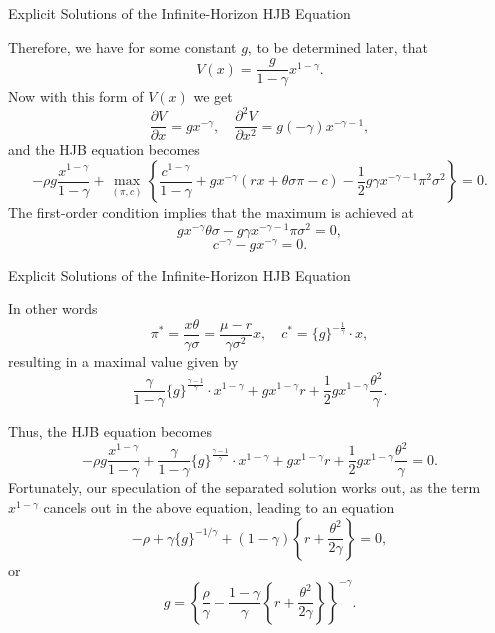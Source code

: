 \documentclass{beamer}
\begin{document}
    \begin{frame}{Explicit Solutions of the Infinite-Horizon HJB Equation}


    {\footnotesize \footnotesize
    Therefore, we have for some constant \( g \), to be determined later, that
    \[
    V(x) = \frac{g}{1 - \gamma}x^{1 - \gamma}. 
    \]
    Now with this form of \( V(x) \) we get
\[
\frac{\partial V}{\partial x} = gx^{-\gamma}, \quad \frac{\partial^2 V}{\partial x^2} = g(-\gamma)x^{-\gamma-1},
\]
 \pause and the HJB equation becomes
\[
-\rho g\frac{x^{1 - \gamma}}{1 - \gamma} + \max_{(\pi,c)} \left\{ \frac{c^{1 - \gamma}}{1 - \gamma} + gx^{-\gamma}(rx + \theta\sigma\pi - c) - \frac{1}{2}g\gamma x^{-\gamma-1}\pi^2\sigma^2 \right\} = 0.
\]
The first-order condition implies that the maximum is achieved at  
\[
gx^{-\gamma} \theta \sigma - g\gamma x^{-\gamma-1} \pi \sigma^2 = 0, 
\]
\[
c^{-\gamma} - gx^{-\gamma} = 0. 
\]  
    }
    \end{frame}

\begin{frame}{Explicit Solutions of the Infinite-Horizon HJB Equation}

    {\footnotesize \footnotesize
      In other words  
    \[
    \pi^* = \frac{x \theta}{\gamma \sigma} = \frac{\mu - r}{\gamma \sigma^2} x, \quad c^* = \{ g \}^{- \frac{1}{\gamma}} \cdot x,
    \]  
    resulting in a maximal value given by  
    \[
    \frac{\gamma}{1 - \gamma} \{ g \}^{ \frac{\gamma - 1}{\gamma}} \cdot x^{1 - \gamma} + gx^{1 - \gamma} r + \frac{1}{2} gx^{1 - \gamma} \frac{\theta^2}{\gamma}.
    \]  

     \pause Thus, the HJB equation becomes  
    \[
    - \rho g \frac{x^{1 - \gamma}}{1 - \gamma} + \frac{\gamma}{1 - \gamma} \{ g \}^{ \frac{\gamma - 1}{\gamma}} \cdot x^{1 - \gamma} + gx^{1 - \gamma} r + \frac{1}{2} gx^{1 - \gamma} \frac{\theta^2}{\gamma} = 0.
    \]
    Fortunately, our speculation of the separated solution works out, as the term \( x^{1-\gamma} \) cancels out in the above equation, leading to an equation
    \[
    - \rho + \gamma \{ g \}^{-1/\gamma} + (1 - \gamma) \left\{ r + \frac{\theta^2}{2\gamma} \right\} = 0,
    \]
    or
    \[
    g = \left\{ \frac{\rho}{\gamma} - \frac{1 - \gamma}{\gamma} \left\{ r + \frac{\theta^2}{2\gamma} \right\} \right\}^{-\gamma}.
    \]

    }
    \end{frame}
\end{document}
